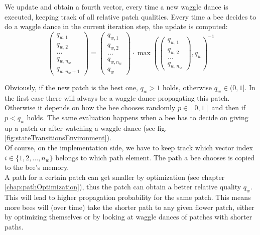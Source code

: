 			We update and obtain a fourth vector, every time a new waggle dance is executed, keeping track of all relative patch qualities. Every time a bee decides to do a waggle dance in the current iteration step, the update is computed:
			\begin{equation}\label{eq:evalPatchQualityNormalize}
				\begin{pmatrix}
					q_{w,1} \\ q_{w,2} \\ \dots \\ q_{w,n_w} \\ q_{w,n_w + 1}
				\end{pmatrix}
				=
				\begin{pmatrix}
					q_{w,1} \\ q_{w,2} \\ \dots \\ q_{w,n_w} \\ q_w
				\end{pmatrix}
				\cdot
				\max(
				\begin{pmatrix}
					q_{w,1} \\ q_{w,2} \\ \dots \\ q_{w,n_w}
				\end{pmatrix}, q_w)^{-1}
			\end{equation}
			
			Obviously, if the new patch is the best one, $q_w > 1$ holds, otherwise $q_w \in (0,1]$. In the first case there will always be a waggle dance propagating this patch. Otherwise it depends on how the bee chooses randomly $p \in [0,1]$ and then if $p < q_w$ holds. The same evaluation happens when a bee has to decide on giving up a patch or after watching a waggle dance (see fig. \ref{fig:stateTransitionsEnvironment}). \\
			Of course, on the implementation side, we have to keep track which vector index $i \in \{1,2, \ldots, n_w\}$ belongs to which path element. The path a bee chooses is copied to the bee's memory.\\

			A path for a certain patch can get smaller by optimization (see chapter \ref{chap:pathOptimization}), thus the patch can obtain a better relative quality $q_w$. This will lead to higher propagation probability for the same patch. This means more bees will (over time) take the shorter path to any given flower patch, either by optimizing themselves or by looking at waggle dances of patches with shorter paths.\\
	
